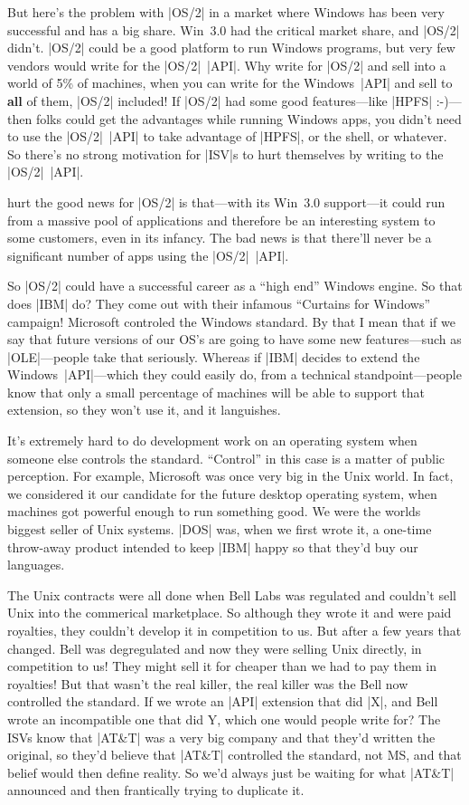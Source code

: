 But here's the problem with |OS/2| in a market where Windows has been
very successful and has a big share.  Win~3.0 had the critical
market share, and |OS/2| didn't.  |OS/2| could be a good platform to run
Windows programs, but very few vendors would write for the |OS/2|~|API|.
Why write for |OS/2| and sell into a world of 5\% of machines, when
you can write for the Windows~|API| and sell to {\bf all} of them, |OS/2| included!
If |OS/2| had some good features---like |HPFS| :-)---then folks could get
the advantages while running Windows apps, you didn't need to use
the |OS/2|~|API| to take advantage of |HPFS|, or the shell, or whatever.  
So there's no strong
motivation for |ISV|s to hurt themselves by writing to the |OS/2|~|API|.

hurt the good news for |OS/2| is that---with its Win~3.0 support---it could
run from a massive pool of applications and therefore be an interesting
system to some customers, even in its infancy.  The bad news is that
there'll never be a significant number of apps using the |OS/2|~|API|.  

So |OS/2| could have a successful career as a ``high end'' Windows engine.
So that does |IBM| do?  They come out with their infamous ``Curtains for
Windows'' campaign!  Microsoft controled the Windows standard.  By that
I mean that if we say that future versions of our OS's are going to
have some new features---such as |OLE|---people take that seriously.
Whereas if |IBM| decides to extend the Windows~|API|---which they could
easily do, from a technical standpoint---people know that only a small
percentage of machines will be able to support that extension, so they
won't use it, and it languishes.

It's extremely hard to do development work on an operating system when
someone else controls the standard.  ``Control'' in this case is a matter
of public perception.  For example, Microsoft was once very big in the 
Unix world.  In fact, we considered it our candidate for the future
desktop operating system, when machines got powerful enough to run something
good.  We were the worlds biggest seller of Unix systems.  |DOS| was, 
when we first wrote it, a one-time throw-away product intended to
keep |IBM| happy so that they'd buy our languages.

The Unix contracts were all done when Bell Labs was regulated and couldn't
sell Unix into the commerical marketplace.  So although they wrote it
and were paid royalties, they couldn't develop it in competition to us.
But after a few years that changed.  Bell was degregulated and now they
were selling Unix directly, in competition to us!  They might sell it for
cheaper than we had to pay them in royalties!  But that wasn't the real
killer, the real killer was the Bell now controlled the standard.  If
we wrote an |API| extension that did |X|, and Bell wrote an incompatible one
that did Y, which one would people write for?  The ISVs know that |AT\&T|
was a very big company and that they'd written the original, so they'd
believe that |AT\&T| controlled the standard, not MS, and that belief would
then define reality.  So we'd always just be waiting for what |AT\&T| announced
and then frantically trying to duplicate it.

